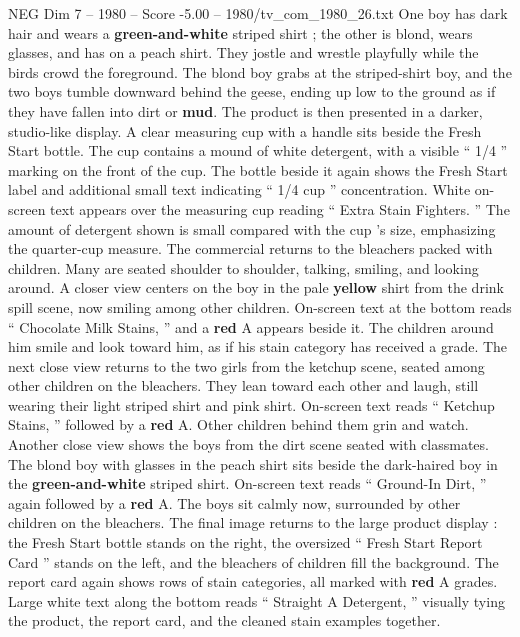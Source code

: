 \begin{textsample}{NEG Dim 7 – 1980 – Score -5.00 – 1980/tv\_com\_1980\_26.txt}
One boy has dark hair and wears a \textbf{green-and-white} striped shirt ; the other is blond, wears glasses, and has on a peach shirt.
They jostle and wrestle playfully while the birds crowd the foreground.
The blond boy grabs at the striped-shirt boy, and the two boys tumble downward behind the geese, ending up low to the ground as if they have fallen into dirt or \textbf{mud}.
The product is then presented in a darker, studio-like display.
A clear measuring cup with a handle sits beside the Fresh Start bottle.
The cup contains a mound of white detergent, with a visible “ 1/4 ” marking on the front of the cup.
The bottle beside it again shows the Fresh Start label and additional small text indicating “ 1/4 cup ” concentration.
White on-screen text appears over the measuring cup reading “ Extra Stain Fighters. ” The amount of detergent shown is small compared with the cup ’s size, emphasizing the quarter-cup measure.
The commercial returns to the bleachers packed with children.
Many are seated shoulder to shoulder, talking, smiling, and looking around.
A closer view centers on the boy in the pale \textbf{yellow} shirt from the drink spill scene, now smiling among other children.
On-screen text at the bottom reads “ Chocolate Milk Stains, ” and a \textbf{red} A appears beside it.
The children around him smile and look toward him, as if his stain category has received a grade.
The next close view returns to the two girls from the ketchup scene, seated among other children on the bleachers.
They lean toward each other and laugh, still wearing their light striped shirt and pink shirt.
On-screen text reads “ Ketchup Stains, ” followed by a \textbf{red} A.
Other children behind them grin and watch.
Another close view shows the boys from the dirt scene seated with classmates.
The blond boy with glasses in the peach shirt sits beside the dark-haired boy in the \textbf{green-and-white} striped shirt.
On-screen text reads “ Ground-In Dirt, ” again followed by a \textbf{red} A.
The boys sit calmly now, surrounded by other children on the bleachers.
The final image returns to the large product display : the Fresh Start bottle stands on the right, the oversized “ Fresh Start Report Card ” stands on the left, and the bleachers of children fill the background.
The report card again shows rows of stain categories, all marked with \textbf{red} A grades.
Large white text along the bottom reads “ Straight A Detergent, ” visually tying the product, the report card, and the cleaned stain examples together.

\end{textsample}

